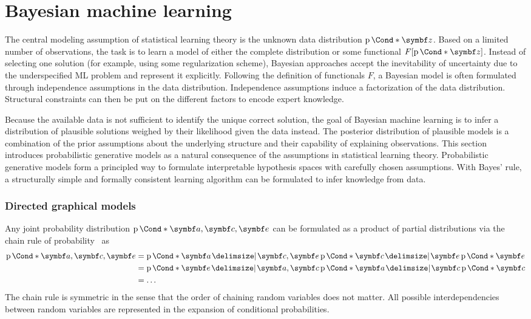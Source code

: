\section{Bayesian machine learning}
\label{toc:bayesian_ml:bayesian_ml}
The central modeling assumption of statistical learning theory is the unknown data distribution $\Prob*{\mat{z}}$.
Based on a limited number of observations, the task is to learn a model of either the complete distribution or some functional $F[\Prob*{\mat{z}}]$.
Instead of selecting one solution (for example, using some regularization scheme), Bayesian approaches accept the inevitability of uncertainty due to the underspecified ML problem and represent it explicitly.
Following the definition of functionals $F$, a Bayesian model is often formulated through independence assumptions in the data distribution.
Independence assumptions induce a factorization of the data distribution.
Structural constraints can then be put on the different factors to encode expert knowledge.

Because the available data is not sufficient to identify the unique correct solution, the goal of Bayesian machine learning is to infer a distribution of plausible solutions weighed by their likelihood given the data instead.
The posterior distribution of plausible models is a combination of the prior assumptions about the underlying structure and their capability of explaining observations.
This section introduces probabilistic generative models as a natural consequence of the assumptions in statistical learning theory.
Probabilistic generative models form a principled way to formulate interpretable hypothesis spaces with carefully chosen assumptions.
With Bayes' rule, a structurally simple and formally consistent learning algorithm can be formulated to infer knowledge from data.

\subsubsection{Directed graphical models}
Any joint probability distribution $\Prob*{\mat{a}, \mat{c}, \mat{e}}$ can be formulated as a product of partial distributions via the chain rule of probability~\parencite{murphy_machine_2012} as
\begin{align}
    \begin{split}
        \Prob*{\mat{a}, \mat{c}, \mat{e}}
        &= \Prob*{\mat{a} \given \mat{c}, \mat{e}}\Prob*{\mat{c} \given \mat{e}}\Prob*{\mat{e}} \\
        &= \Prob*{\mat{e} \given \mat{a}, \mat{c}}\Prob*{\mat{a} \given \mat{c}}\Prob*{\mat{c}} \\
        &= \dots
    \end{split}
\end{align}
The chain rule is symmetric in the sense that the order of chaining random variables does not matter.
All possible interdependencies between random variables are represented in the expansion of conditional probabilities.

